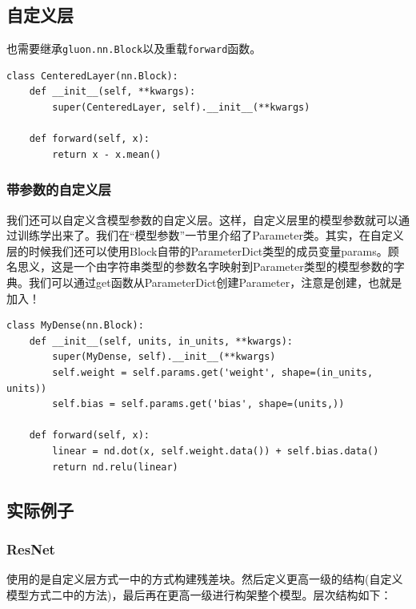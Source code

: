 \subsection{自定义层}

也需要继承\verb|gluon.nn.Block|以及重载\verb|forward|函数。

\begin{lstlisting}
class CenteredLayer(nn.Block):
    def __init__(self, **kwargs):
        super(CenteredLayer, self).__init__(**kwargs)

    def forward(self, x):
        return x - x.mean()
\end{lstlisting}

\subsubsection{带参数的自定义层}

我们还可以自定义含模型参数的自定义层。这样，自定义层里的模型参数就可以通过训练学出来了。我们在“模型参数”一节里介绍了Parameter类。其实，在自定义层的时候我们还可以使用Block自带的ParameterDict类型的成员变量params。顾名思义，这是一个由字符串类型的参数名字映射到Parameter类型的模型参数的字典。我们可以通过get函数从ParameterDict创建Parameter，注意是创建，也就是加入！

\begin{lstlisting}
class MyDense(nn.Block):
    def __init__(self, units, in_units, **kwargs):
        super(MyDense, self).__init__(**kwargs)
        self.weight = self.params.get('weight', shape=(in_units, units))
        self.bias = self.params.get('bias', shape=(units,))

    def forward(self, x):
        linear = nd.dot(x, self.weight.data()) + self.bias.data()
        return nd.relu(linear)
\end{lstlisting}

\subsection{实际例子}

\subsubsection{ResNet}

使用的是自定义层方式一中的方式构建残差块。然后定义更高一级的结构(自定义模型方式二中的方法)，最后再在更高一级进行构架整个模型。层次结构如下：

